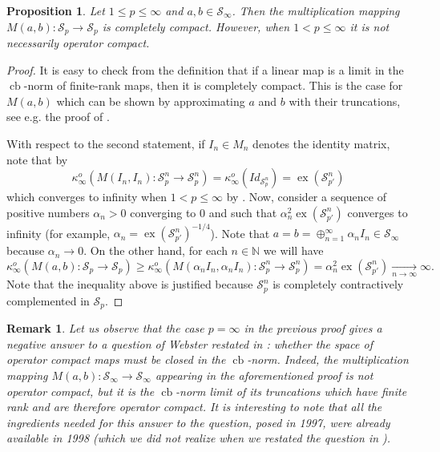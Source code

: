 \documentclass[11pt]{amsart}
\DeclareMathOperator{\cb}{cb}
\DeclareMathOperator{\ex}{ex}
\newcommand{\N}{{\mathbb{N}}}
\newtheorem{proposition}[theorem]{Proposition}
\newtheorem{remark}[theorem]{Remark}
\numberwithin{equation}{section}
\begin{document}
\begin{proposition}\label{proposition-multiplication-is-completely-compact}
Let $1 \leq p \leq \infty$ and  $a,b \in \mathcal{S}_{\infty}$. Then the multiplication mapping
$
M(a,b) : \mathcal{S}_p \to \mathcal{S}_p
$
is completely compact.
However, when $1< p \le \infty$ it is not necessarily operator compact. 
\end{proposition}

\begin{proof}
It is easy to check from the definition that if a linear map is a limit in the $\cb$-norm of finite-rank maps, then it is completely compact.
This is the case for $M(a,b)$ which can be shown by approximating $a$ and $b$ with their truncations, see e.g. the proof of \cite[Prop. 2.7]{ChaDiGa-Operator-p-compact}.

With respect to the second statement, if $I_n \in M_n$ denotes the identity matrix, note that by \cite[Cor. 4.16]{Oikhberg-Thesis}
\[
\kappa_\infty^o( M(I_n,I_n) : \mathcal{S}_p^n \to \mathcal{S}_p^n ) = \kappa_\infty^o( Id_{\mathcal{S}_p^n}) = \ex(\mathcal{S}_{p'}^n) 
\]
which converges to infinity when $1 < p \le \infty$ by \cite[Ex. 3.3.1.3]{Junge-Habilitationschrift}.
Now, consider a sequence of positive numbers $\alpha_n >0$ converging to 0 and such that $\alpha_n^2\ex(\mathcal{S}_{p'}^n)$ converges to infinity (for example, $\alpha_n = \ex(\mathcal{S}_{p'}^n)^{-1/4}$).
Note that $a= b = \oplus_{n=1}^\infty \alpha_n I_n \in \mathcal{S}_\infty$ because $\alpha_n \to 0$.
On the other hand, for each $n \in \N$ we will have
\[
\kappa_\infty^o( M(a,b):\mathcal{S}_p \to \mathcal{S}_p ) \ge \kappa_\infty^o( M(\alpha_nI_n,\alpha_nI_n) : \mathcal{S}_p^n \to \mathcal{S}_p^n ) = \alpha_n^2 \ex(\mathcal{S}_{p'}^n) \xrightarrow[n\to\infty]{} \infty.
\]
Note that the inequality above is justified because $\mathcal{S}_p^n$ is completely contractively complemented in $\mathcal{S}_p$. 
\end{proof}


\begin{remark}
Let us observe that the case $p=\infty$ in the previous proof gives a negative answer to a question of Webster \cite[Sec. 4.1]{Webster} restated in \cite[Problem 4.3]{ChaDiGa-Operator-p-compact}: whether the space of operator compact maps must be closed in the $\cb$-norm.
Indeed, the multiplication mapping $M(a,b):\mathcal{S}_\infty \to \mathcal{S}_\infty$ appearing in the aforementioned proof is not operator compact, but it is the $\cb$-norm limit of its truncations which have finite rank and are therefore operator compact.
It is interesting to note that all the ingredients needed for this answer to the question, posed in 1997, were already available in 1998 (which we did not realize when we restated the question in \cite{ChaDiGa-Operator-p-compact}).
\end{remark}
\end{document}
